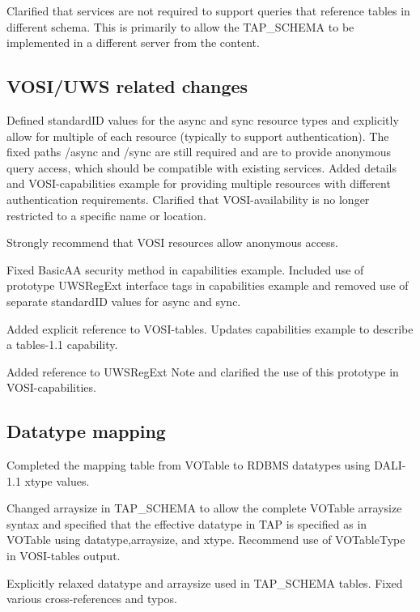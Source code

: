 \documentclass[11pt,letter]{ivoa}
\newcommand{\tapschema}{TAP\_SCHEMA}
\newcommand{\tapschema}{\mbox{%
  \relsize{-0.5}TAP\discretionary{-}{}{\kern-2pt\_}SCHEMA}}
\begin{document}
Clarified that services are not required to support queries that reference tables 
in different schema. This is primarily to allow the \tapschema{} to be implemented 
in a different server from the content.

\subsection{VOSI/UWS related changes}

Defined standardID values for the async and sync resource types and explicitly 
allow for multiple of each resource (typically to support authentication). The 
fixed paths /async and /sync are still required and are to provide anonymous 
query access, which should be compatible with existing services.
Added details and VOSI-capabilities example for providing multiple resources with different 
authentication requirements. Clarified that VOSI-availability is no longer restricted to a
specific name or location.

Strongly recommend that VOSI resources allow anonymous access.

Fixed BasicAA security method in capabilities example. Included use of prototype
UWSRegExt interface tags in capabilities example and removed use of separate
standardID values for async and sync.

Added explicit reference to VOSI-tables. Updates capabilities example to describe a
tables-1.1 capability.

Added reference to UWSRegExt Note and clarified the use of this prototype in VOSI-capabilities.

\subsection{Datatype mapping}

Completed the mapping table from VOTable to RDBMS datatypes using DALI-1.1 xtype values.

Changed arraysize in \tapschema{} to allow the complete VOTable arraysize syntax and specified that the effective datatype in TAP is specified as in VOTable using datatype,arraysize, and xtype. Recommend use of VOTableType in VOSI-tables output.

Explicitly relaxed datatype and arraysize used in \tapschema{} tables. Fixed various cross-references and typos. 


\end{document}
